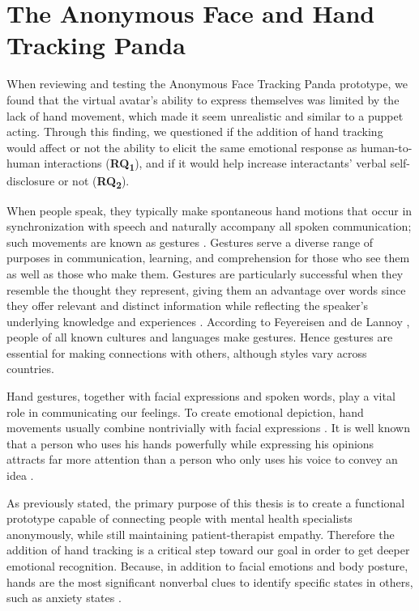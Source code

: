 \section{The Anonymous Face and Hand Tracking Panda}
When reviewing and testing the Anonymous Face Tracking Panda prototype, we found that the virtual avatar's ability to express themselves was limited by the lack of hand movement, which made it seem unrealistic and similar to a puppet acting. Through this finding, we questioned if the addition of hand tracking would affect or not the ability to elicit the same emotional response as human-to-human interactions (\textbf{RQ\textsubscript{1}}), and if it would help increase interactants' verbal self-disclosure or not (\textbf{RQ\textsubscript{2}}).

When people speak, they typically make spontaneous hand motions that occur in synchronization with speech and naturally accompany all spoken communication; such movements are known as gestures \cite{CLO20}. Gestures serve a diverse range of purposes in communication, learning, and comprehension for those who see them as well as those who make them. Gestures are particularly successful when they resemble the thought they represent, giving them an advantage over words since they offer relevant and distinct information while reflecting the speaker's underlying knowledge and experiences \cite{CLO20, KAN16B}. According to Feyereisen and de Lannoy \cite{FEY91}, people of all known cultures and languages make gestures. Hence gestures are essential for making connections with others, although styles vary across countries.

Hand gestures, together with facial expressions and spoken words, play a vital role in communicating our feelings. To create emotional depiction, hand movements usually combine nontrivially with facial expressions \cite{ARJ20}. It is well known that a person who uses his hands powerfully while expressing his opinions attracts far more attention than a person who only uses his voice to convey an idea \cite{COO10, WAK18}.

As previously stated, the primary purpose of this thesis is to create a functional prototype capable of connecting people with mental health specialists anonymously, while still maintaining patient-therapist empathy. Therefore the addition of hand tracking is a critical step toward our goal in order to get deeper emotional recognition. Because, in addition to facial emotions and body posture, hands are the most significant nonverbal clues to identify specific states in others, such as anxiety states \cite{WAX97, REI22}. 

